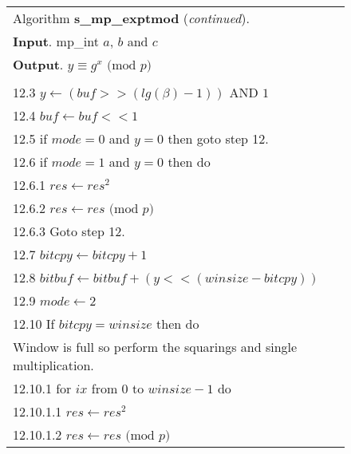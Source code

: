 \documentclass[b5paper]{book}
\begin{document}
\newpage\begin{figure}[!here]
\begin{small}
\begin{center}
\begin{tabular}{l}
\hline Algorithm \textbf{s\_mp\_exptmod} (\textit{continued}). \\
\textbf{Input}.   mp\_int $a$, $b$ and $c$ \\
\textbf{Output}.  $y \equiv g^x \mbox{ (mod }p\mbox{)}$ \\
\hline \\
\hspace{3mm}12.3  $y \leftarrow (buf >> (lg(\beta) - 1))$ AND $1$ \\
\hspace{3mm}12.4  $buf \leftarrow buf << 1$ \\
\hspace{3mm}12.5  if $mode = 0$ and $y = 0$ then goto step 12. \\
\hspace{3mm}12.6  if $mode = 1$ and $y = 0$ then do \\
\hspace{6mm}12.6.1  $res \leftarrow res^2$ \\
\hspace{6mm}12.6.2  $res \leftarrow res \mbox{ (mod }p\mbox{)}$ \\
\hspace{6mm}12.6.3  Goto step 12. \\
\hspace{3mm}12.7  $bitcpy \leftarrow bitcpy + 1$ \\
\hspace{3mm}12.8  $bitbuf \leftarrow bitbuf + (y << (winsize - bitcpy))$ \\
\hspace{3mm}12.9  $mode \leftarrow 2$ \\
\hspace{3mm}12.10  If $bitcpy = winsize$ then do \\
\hspace{6mm}Window is full so perform the squarings and single multiplication. \\
\hspace{6mm}12.10.1  for $ix$ from $0$ to $winsize -1$ do \\
\hspace{9mm}12.10.1.1  $res \leftarrow res^2$ \\
\hspace{9mm}12.10.1.2  $res \leftarrow res \mbox{ (mod }p\mbox{)}$ \\

\end{tabular}
\end{center}
\end{small}
\end{figure}
\end{document}
